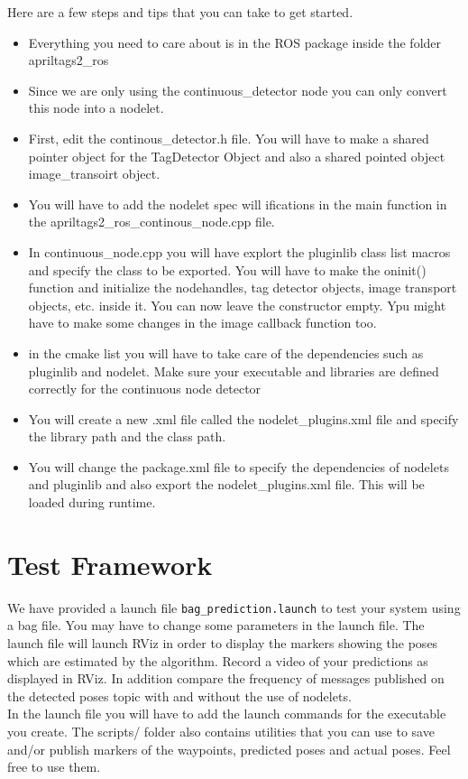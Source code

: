 \documentclass[letta4 paper]{article}
\numberwithin{equation}{section}
\newcommand{\0}{\mathbf{0}}
\begin{document}
	Here are a few steps and tips that you can take to get started.
	\begin{itemize}
		
		\item Everything you need to care about is in the ROS package inside the folder apriltags2\_ros
		
		\item Since we are only using the continuous\_detector node you can only convert this node into a nodelet. \item First, edit the continous\_detector.h file. You will have to make a shared pointer object for the TagDetector Object and also a shared pointed object image\_transoirt object. 
		\item  You will have to add the nodelet spec will ifications in the main function in the apriltags2\_ros\_continous\_node.cpp file. 
		\item In continuous\_node.cpp you will have explort the pluginlib class list macros and specify the class to be exported. You will have to make the oninit() function and initialize the nodehandles, tag detector objects, image transport objects, etc. inside it. You can now leave the constructor empty. Ypu might have to make some changes in the image callback function too. 
		\item in the cmake list you will have to take care of the dependencies such as pluginlib and nodelet. Make sure your executable and libraries are defined correctly for the continuous node detector
		\item You will create a new .xml file called the nodelet\_plugins.xml file and specify the library path and the class path. 
		\item You will change the package.xml file to specify the dependencies of nodelets and pluginlib and also export the nodelet\_plugins.xml file. This will be loaded during runtime. 

	\end{itemize}

	\section{Test Framework} 
	We have provided a launch file \texttt{bag\_prediction.launch} to test your system using a bag file. You may have to change some parameters in the launch file. 
	The launch file will launch RViz in order to display the markers showing the poses which are estimated by the algorithm. Record a video of your predictions as displayed in RViz. In addition compare the frequency of messages published on the detected poses topic with and without the use of nodelets. \\
	In the launch file you will have to add the launch commands for the executable you create. The scripts/ folder also contains utilities that you can use to save and/or publish markers of the waypoints, predicted poses and actual poses. Feel free to use them. 
	
\end{document}
